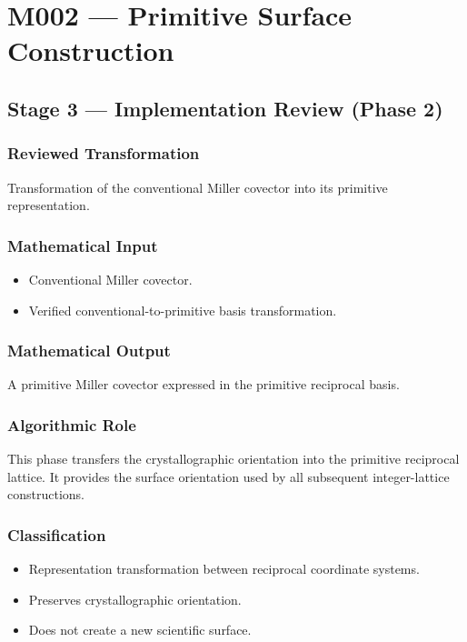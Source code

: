 
\chapter{M002 --- Primitive Surface Construction}

\section{Stage 3 --- Implementation Review (Phase 2)}

\subsection{Reviewed Transformation}

Transformation of the conventional Miller covector into its primitive
representation.

\subsection{Mathematical Input}

\begin{itemize}
\item Conventional Miller covector.
\item Verified conventional-to-primitive basis transformation.
\end{itemize}

\subsection{Mathematical Output}

A primitive Miller covector expressed in the primitive reciprocal basis.

\subsection{Algorithmic Role}

This phase transfers the crystallographic orientation into the primitive
reciprocal lattice. It provides the surface orientation used by all
subsequent integer-lattice constructions.

\subsection{Classification}

\begin{itemize}
\item Representation transformation between reciprocal coordinate systems.
\item Preserves crystallographic orientation.
\item Does not create a new scientific surface.
\end{itemize}

